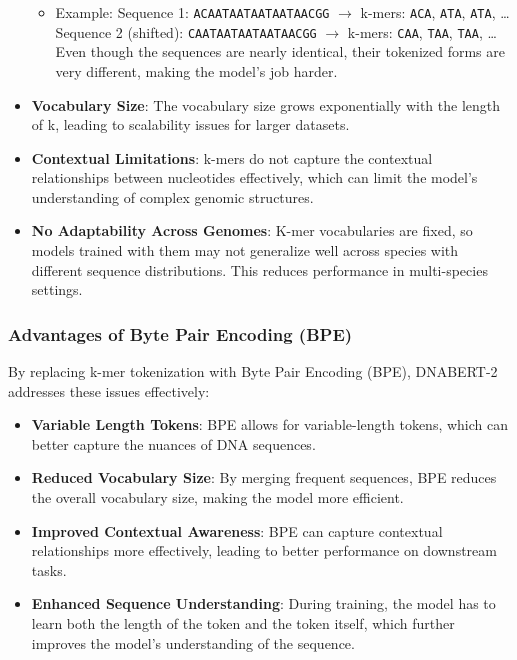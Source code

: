 \begin{itemize}
\begin{itemize}
\item Example: Sequence 1: \texttt{ACAATAATAATAATAACGG} $\rightarrow$ k-mers: \texttt{ACA}, \texttt{ATA}, \texttt{ATA}, \dots
Sequence 2 (shifted): \texttt{CAATAATAATAATAACGG} $\rightarrow$ k-mers: \texttt{CAA}, \texttt{TAA}, \texttt{TAA}, \dots
Even though the sequences are nearly identical, their tokenized forms are very different, making the model's job harder.
\end{itemize}
\item \textbf{Vocabulary Size}: The vocabulary size grows exponentially with the length of k, leading to scalability issues for larger datasets.
\item \textbf{Contextual Limitations}: k-mers do not capture the contextual relationships between nucleotides effectively, which can limit the model's understanding of complex genomic structures.
\item \textbf{No Adaptability Across Genomes}: K-mer vocabularies are fixed, so models trained with them may not generalize well across species with different sequence distributions. This reduces performance in multi-species settings.
\end{itemize}

\subsubsection{Advantages of Byte Pair Encoding (BPE)}
By replacing k-mer tokenization with Byte Pair Encoding (BPE), DNABERT-2 addresses these issues effectively:
\begin{itemize}
\item \textbf{Variable Length Tokens}: BPE allows for variable-length tokens, which can better capture the nuances of DNA sequences.
\item \textbf{Reduced Vocabulary Size}: By merging frequent sequences, BPE reduces the overall vocabulary size, making the model more efficient.
\item \textbf{Improved Contextual Awareness}: BPE can capture contextual relationships more effectively, leading to better performance on downstream tasks.
\item \textbf{Enhanced Sequence Understanding}: During training, the model has to learn both the length of the token and the token itself, which further improves the model's understanding of the sequence.
\end{itemize}
